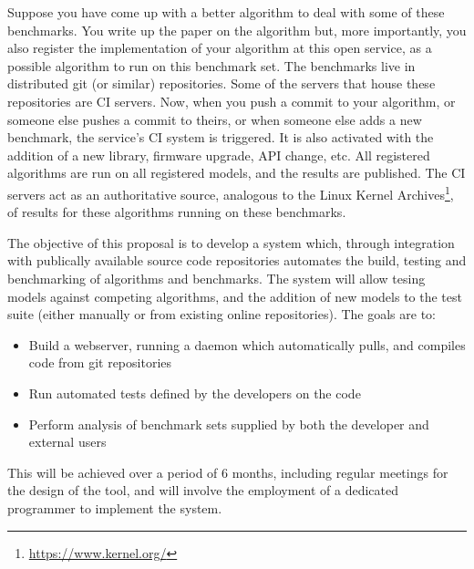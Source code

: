 \documentclass[a4paper,11pt]{article}
\begin{document}
Suppose you have come up with a better algorithm to deal with some of
these benchmarks. You write up the paper on the algorithm but, more
importantly, you also register the implementation of your algorithm at
this open service, as a possible algorithm to run on this benchmark
set. The benchmarks live in distributed git (or similar)
repositories. Some of the servers that house these repositories are CI
servers. Now, when you push a commit to your algorithm, or someone
else pushes a commit to theirs, or when someone else adds a new
benchmark, the service's CI system is triggered. It is also activated
with the addition of a new library, firmware upgrade, API change,
etc. All registered algorithms are run on all registered models, and
the results are published. The CI servers act as an authoritative
source, analogous to the Linux Kernel
Archives\footnote{\url{https://www.kernel.org/}}, of results for these
algorithms running on these benchmarks.

The objective of this proposal is to develop a system which, through
integration with publically available source code repositories automates
the build, testing and benchmarking of algorithms and benchmarks. The 
system will allow tesing models against competing algorithms, and the
addition of new models to the test suite (either manually or from existing
online repositories). The goals are to:

\begin{itemize}
	\item Build a webserver, running a daemon which automatically pulls, and compiles
code from git repositories
\item Run automated tests defined by the developers on the code
\item Perform analysis of benchmark sets supplied by both the developer and external
users
\end{itemize}

This will be achieved over a period of 6 months, including regular meetings
for the design of the tool, and will involve the employment of a dedicated 
programmer to implement the system.

\end{document}
